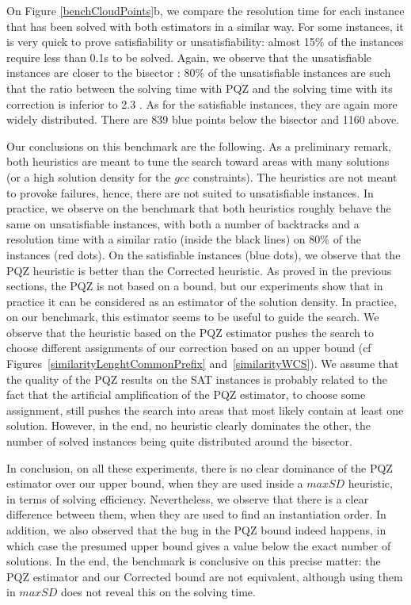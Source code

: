 \documentclass[jair,twoside,11pt,theapa]{article}
\begin{document}
On Figure \ref{benchCloudPoints}b, we compare the resolution time for each instance that has been solved with both estimators in a similar way. For some instances, it is very quick to prove satisfiability or unsatisfiability: almost 15\% of the instances require less than 0.1s to be solved. Again, we  observe that the unsatisfiable instances are closer to the bisector : 80\% of the unsatisfiable instances are such that the ratio between the solving time with PQZ and the solving time with its correction is inferior to 2.3 . As for the satisfiable instances, they are again more widely distributed. There are 839 blue points below the bisector and 1160 above. %

Our conclusions on this benchmark are the following. As a preliminary remark, both heuristics are meant to tune the search toward areas with many solutions (or a high solution density for the $gcc$ constraints). The heuristics are not meant to provoke failures, hence, there are not suited to unsatisfiable instances. In practice, we observe on the benchmark that both heuristics roughly behave the same on unsatisfiable instances, with both a number of backtracks and a resolution time with a similar ratio (inside the black lines) on 80\% of the instances (red dots). On the satisfiable instances (blue dots), we observe that the PQZ heuristic is better than the Corrected heuristic. As proved in the previous sections, the PQZ is not based on a bound, but our experiments show that in practice it can be considered as an estimator of the solution density. In practice, on our benchmark, this estimator seems to be useful to guide the search. 
%
We observe that the heuristic based on the PQZ estimator pushes the search to choose different assignments of our correction based on an upper bound (cf Figures~\ref{similarityLenghtCommonPrefix} and~\ref{similarityWCS}). We assume that the quality of the PQZ results on the SAT instances is probably related to the fact that the artificial amplification of the PQZ estimator, to choose some assignment, still pushes the search into areas that most likely contain at least one solution.
%
However, in the end, no heuristic clearly dominates the other, the number of solved instances being quite distributed around the bisector.
  

In conclusion, on all these experiments, there is no clear dominance of the PQZ estimator over our upper bound, when they are used inside a $maxSD$ heuristic, in terms of solving efficiency. Nevertheless, we observe that there is a clear difference between them, when they are used to find an instantiation order. In addition, we also observed that the bug in the PQZ bound indeed happens, in which case the presumed upper bound gives a value below the exact number of solutions. In the end, the benchmark is conclusive on this precise matter: the PQZ estimator and our Corrected bound are not equivalent, although using them in $maxSD$ does not reveal this on the solving time.
\end{document}
